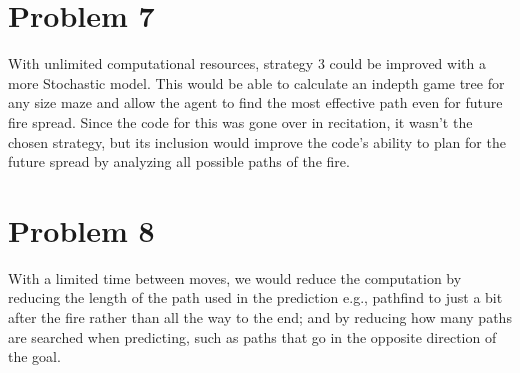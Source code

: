 \documentclass[12pt]{report}
\begin{document}
\section{Problem 7}
With unlimited computational resources, strategy 3 could be improved with a more Stochastic model. This would be able to calculate an indepth game tree for any size maze and allow the agent to find the most effective path even for future fire spread. Since the code for this was gone over in recitation, it wasn't the chosen strategy, but its inclusion would improve the code's ability to plan for the future spread by analyzing all possible paths of the fire.

\section{Problem 8}
With a limited time between moves, we would reduce the computation by reducing the length of the path used in the prediction e.g., pathfind to just a bit after the fire rather than all the way to the end; and by reducing how many paths are searched when predicting, such as paths that go in the opposite direction of the goal.
\end{document}
